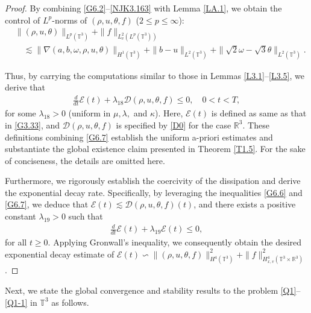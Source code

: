 \documentclass[reqno,11pt]{amsart}
\theoremstyle{plain}
\numberwithin{equation}{section}
\begin{document}
\begin{proof}
By combining \eqref{G6.2}--\eqref{NJK3.163} with Lemma \ref{LA.1}, 
we   obtain the control of $L^p$-norms of $(\rho,u,\theta,f)$ ($2 \leq p \leq \infty$):
\begin{align}\label{G6.6}
&\|(\rho,u,\theta)\|_{L^p(\mathbb{T}^3)}+\|f\|_{L_v^2(L^p(\mathbb{T}^3))} \nonumber\\
&\quad \lesssim   \|\nabla (a,b,\omega,\rho, u, \theta )\|_{H^1(\mathbb{T}^3)} 
+ \|b-u\|_{L^2(\mathbb{T}^3)}+ \|\sqrt{2} \omega-\sqrt{3} \theta\|_{L^2(\mathbb{T}^3)} .    
\end{align}
 

 
Thus, by carrying the computations similar to those in Lemmas \ref{L3.1}--\ref{L3.5}, we derive that
\begin{align}\label{G6.7}  
\frac{d}{dt}\mathcal{E}(t) + \lambda_{18}\mathcal{D}(\rho,u,\theta,f) \leq 0, \quad 0 < t < T,  
\end{align}  
for some $\lambda_{18} > 0$  (uniform in $\mu,\lambda,$ and $\kappa$).
 Here, $\mathcal{E}(t)$ is defined  as same as that in \eqref{G3.33}, 
 and $\mathcal{D}(\rho,u,\theta,f)$ is specified by \eqref{D0} 
 for the case   $  \mathbb{R}^3$. These definitions combining \eqref{G6.7}  
 establish the uniform a-priori estimates and substantiate 
 the global existence claim presented in Theorem \ref{T1.5}. 
 For the sake of conciseness, the details are omitted here.

Furthermore, we rigorously establish the coercivity of 
the dissipation and derive the exponential decay rate. 
Specifically, by leveraging the inequalities \eqref{G6.6} 
and \eqref{G6.7}, we deduce that $\mathcal{E}(t) 
\lesssim \mathcal{D}(\rho,u,\theta,f)(t)$, and there exists
 a positive constant $\lambda_{19} > 0$ such that  
\begin{align*}  
\frac{d}{dt}\mathcal{E}(t) + \lambda_{19}\mathcal{E}(t) \leq 0,  
\end{align*}  
for all $t \geq 0$. Applying Gronwall's inequality, we consequently 
obtain the desired exponential decay estimate of 
$\mathcal{E}(t) \backsim \|(\rho,u,\theta,f)\|_{H^4(\mathbb{T}^3)}^2 
+ \|f\|_{H_{x,v}^4(\mathbb{T}^3\times\mathbb{R}^3)}^2$.
\end{proof}

\smallskip
Next, we state  the global convergence and stability results to the  problem \eqref{Q1}--\eqref{Q1-1} 
in $\mathbb{T}^3$ as follows. 
\end{document}
